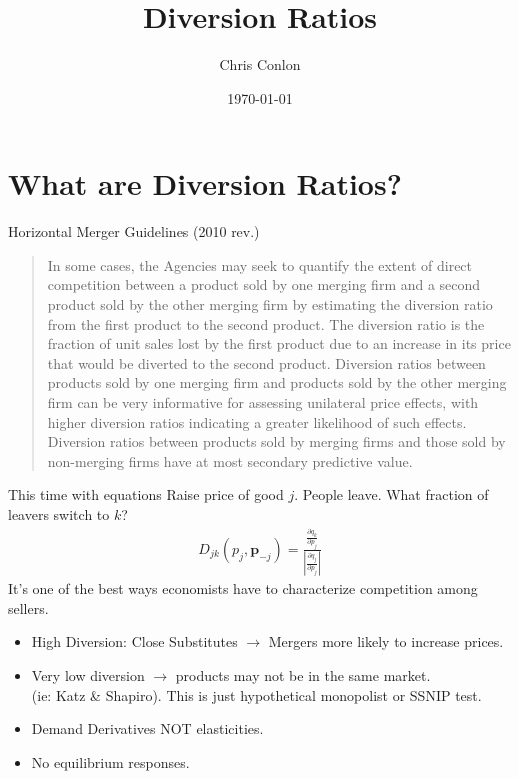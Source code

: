 \documentclass[aspectratio=169,10pt]{beamer}
\title{Diversion Ratios}
\author{Chris Conlon}
\institute{Grad IO}
\date{\today}
\begin{document}
\frame{\titlepage}
\section{What are Diversion Ratios?} 

\begin{frame}{Horizontal Merger Guidelines (2010 rev.)}
\begin{quote}
In some cases, the Agencies may seek to quantify the extent of direct competition between a product sold by one merging firm and a second product sold by the other merging firm by estimating the diversion ratio from the first product to the second product. The diversion ratio is the \alert{fraction of unit sales lost by the first product due to an increase in its price that would be diverted to the second product}. Diversion ratios between products sold by one merging firm and products sold by the other merging firm can be very informative for assessing unilateral price effects, with \alert{higher diversion ratios indicating a greater likelihood of such effects}. Diversion ratios between products sold by merging firms and those sold by \alert{non-merging firms have at most secondary predictive value.}
\end{quote}
\end{frame}

\begin{frame}{This time with equations}
 Raise price of good $j$. People leave. What fraction of leavers switch to $k$?
\begin{eqnarray*}
D_{jk} (p_j,\symbf{p}_{-j})= \frac{\frac{\partial q_k}{\partial p_j}}{\left|\frac{\partial q_j}{\partial p_j} \right|}
\end{eqnarray*}
It's one of the best ways economists have to characterize competition among sellers.
\begin{itemize}
\item High Diversion: Close Substitutes $\rightarrow$ Mergers more likely to increase prices.
\item Very low diversion $\rightarrow$ products may not be in the same market.\\ (ie: Katz \& Shapiro). This is just hypothetical monopolist or SSNIP test.
\item Demand Derivatives NOT elasticities.
\item No equilibrium responses.
\end{itemize}
\end{frame}
\end{document}
